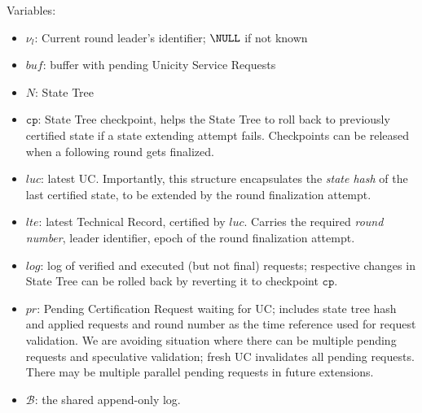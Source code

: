 Variables:
\begin{itemize}
  \item $\nu_l$: Current round leader's identifier; $\NULL$ if not known
  \item $buf$: buffer with pending Unicity Service Requests
  \item $N$: State Tree
  \item $\mathtt{cp}$: State Tree checkpoint, helps the State Tree to roll back to previously certified state if a state extending attempt fails. Checkpoints can be released when a following round gets finalized.
  \item $luc$: latest UC. Importantly, this structure encapsulates the \emph{state hash} of the last certified state, to be extended by the round finalization attempt.
  \item $lte$: latest Technical Record, certified by $luc$. Carries the required \emph{round number}, leader identifier, epoch of the round finalization attempt.
  \item $log$: log of verified and executed (but not final) requests; respective changes in State Tree can be rolled  back by reverting it to checkpoint $\mathtt{cp}$.
  \item $pr$: Pending Certification Request waiting for UC; includes state tree hash and applied requests and round number as the time reference used for request validation. We are avoiding situation where there can be multiple pending requests and speculative validation; fresh UC invalidates all pending requests. \\
  There may be multiple parallel pending requests in future extensions.
  \item $\mathcal{B}$: the shared append-only log.
\end{itemize}


